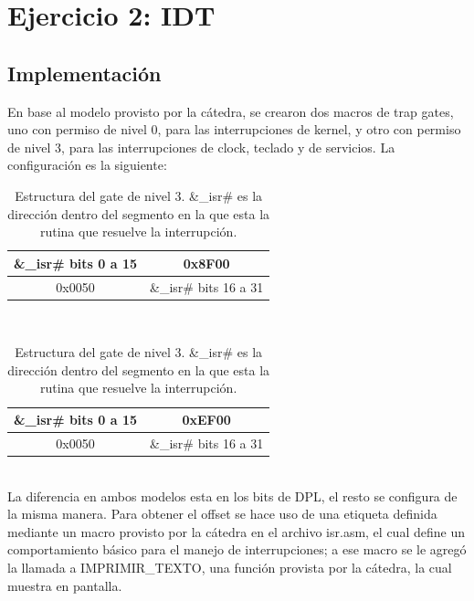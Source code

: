 \documentclass[10pt, a4paper]{article}
\begin{document}
\section{Ejercicio 2: IDT}
\subsection{Implementación}
En base al modelo provisto por la cátedra, se crearon dos macros de trap gates, uno con permiso de nivel 0, para las interrupciones de kernel, y otro con permiso de nivel 3, para las interrupciones de clock, teclado y de servicios. La configuración es la siguiente:
\begin{table}[h]
	\begin{subtable}[h]{0.5\textwidth}
		\begin{minipage}{0.9\textwidth}
			\resizebox{8cm}{!} {
				\begin{tabular}{|c|c|}
					\hline
					\&\_isr\# bits 0 a 15 & 0x8F00 \\ \hline
					0x0050 & \&\_isr\# bits 16 a 31 \\
					\hline
				\end{tabular}
			}
			\caption{Estructura del gate de nivel 0. \&\_isr\# es la dirección dentro del segmento en la que esta la rutina que resuelve la interrupción.}
		\end{minipage}
	\end{subtable}
~
	\begin{subtable}[h]{0.5\textwidth}
		\begin{minipage}{0.9\textwidth}
			\resizebox{8cm}{!} {
				\begin{tabular}{|c|c|}
					\hline
					\&\_isr\# bits 0 a 15 & 0xEF00 \\ \hline
					0x0050 & \&\_isr\# bits 16 a 31 \\
					\hline
				\end{tabular}
			}
			\caption{Estructura del gate de nivel 3. \&\_isr\# es la dirección dentro del segmento en la que esta la rutina que resuelve la interrupción.}
		\end{minipage}
	\end{subtable}
\end{table}
\\
La diferencia en ambos modelos esta en los bits de DPL, el resto se configura de la misma manera.
Para obtener el offset se hace uso de una etiqueta definida mediante un macro provisto por la cátedra en el archivo isr.asm, el cual define un comportamiento básico para el manejo de interrupciones; a ese macro se le agregó la llamada a IMPRIMIR\_TEXTO, una función provista por la cátedra, la cual muestra en pantalla.
\end{document}
